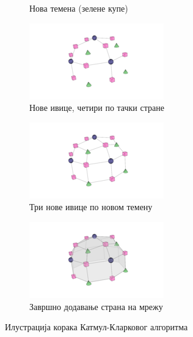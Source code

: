 \documentclass[12pt]{article}
\begin{document}
\begin{figure}[H]
\begin{subfigure}{0.3\linewidth}
			\caption{Нова темена (зелене купе)}
		\end{subfigure}
		\begin{subfigure}{0.3\linewidth}
			\includegraphics[width=\linewidth]{slike/Catmull-Clark_Recursive_Step_4.png}
			\caption{Нове ивице, четири по тачки стране}
		\end{subfigure}
		\begin{subfigure}{0.3\linewidth}
			\includegraphics[width=\linewidth]{slike/Catmull-Clark_Recursive_Step_5.png}
			\caption{Три нове ивице по новом темену}
		\end{subfigure}
		\begin{subfigure}{0.3\linewidth}
			\includegraphics[width=\linewidth]{slike/Catmull-Clark_Recursive_Step_6.png}
			\caption{Завршно додавање страна на мрежу}
		\end{subfigure}
		\caption{Илустрација корака Катмул-Кларковог алгоритма}
		\label{fig:katmulklark}
	\end{figure}
\end{document}
